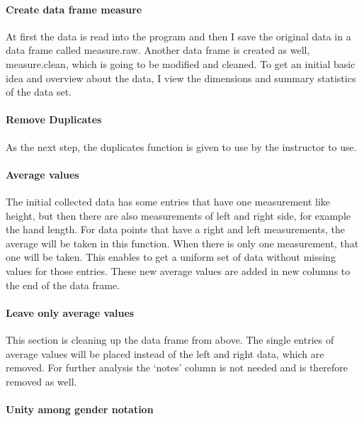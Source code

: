 \documentclass[]{article}
\begin{document}
\paragraph{Create data frame measure}
\label{sec:appendix-create-data-frame-measure}

At first the data is read into the program and then I save the original
data in a data frame called measure.raw. Another data frame is created
as well, measure.clean, which is going to be modified and cleaned. To
get an initial basic idea and overview about the data, I view the
dimensions and summary statistics of the data set.

\paragraph{Remove Duplicates}
\label{sec:appendix-remove-duplicates}

As the next step, the duplicates function is given to use by the
instructor to use.

\paragraph{Average values}
\label{sec:appendix-average-values}

The initial collected data has some entries that have one measurement
like height, but then there are also measurements of left and right
side, for example the hand length. For data points that have a right and
left measurements, the average will be taken in this function. When
there is only one measurement, that one will be taken. This enables to
get a uniform set of data without missing values for those entries.
These new average values are added in new columns to the end of the data
frame.

\paragraph{Leave only average values}
\label{sec:appendix-leave-avg-values}

This section is cleaning up the data frame from above. The single
entries of average values will be placed instead of the left and right
data, which are removed. For further analysis the `notes' column is not
needed and is therefore removed as well.

\paragraph{Unity among gender notation}
\label{sec:appendix-gender-notation}
\end{document}
